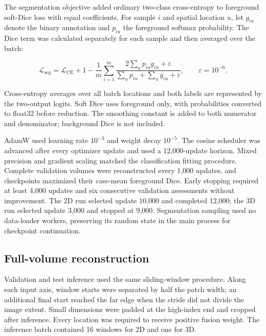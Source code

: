 \documentclass[11pt,a4paper]{article}
\begin{document}
The segmentation objective added ordinary two-class cross-entropy to foreground soft-Dice loss with equal coefficients. For sample $i$ and spatial location $u$, let $g_{iu}$ denote the binary annotation and $p_{iu}$ the foreground softmax probability. The Dice term was calculated separately for each sample and then averaged over the batch:




\begin{equation}
\label{eq:segmentation-loss}
\mathcal{L}_{\mathrm{seg}}=\mathcal{L}_{\mathrm{CE}}+1-\frac{1}{m}\sum_{i=1}^{m}\frac{2\sum_u p_{iu}g_{iu}+\varepsilon}{\sum_u p_{iu}+\sum_u g_{iu}+\varepsilon},\qquad \varepsilon=10^{-6}.
\end{equation}


Cross-entropy averages over all batch locations and both labels are represented by the two-output logits. Soft Dice uses foreground only, with probabilities converted to float32 before reduction. The smoothing constant is added to both numerator and denominator; background Dice is not included.



AdamW used learning rate $10^{-3}$ and weight decay $10^{-5}$. The cosine scheduler was advanced after every optimizer update and used a 12,000-update horizon. Mixed precision and gradient scaling matched the classification fitting procedure. Complete validation volumes were reconstructed every 1,000 updates, and checkpoints maximized their case-mean foreground Dice. Early stopping required at least 4,000 updates and six consecutive validation assessments without improvement. The 2D run selected update 10,000 and completed 12,000; the 3D run selected update 3,000 and stopped at 9,000. Segmentation sampling used no data-loader workers, preserving its random state in the main process for checkpoint continuation.



\subsection*{Full-volume reconstruction}

Validation and test inference used the same sliding-window procedure. Along each input axis, window starts were separated by half the patch width; an additional final start reached the far edge when the stride did not divide the image extent. Small dimensions were padded at the high-index end and cropped after inference. Every location was required to receive positive fusion weight. The inference batch contained 16 windows for 2D and one for 3D.
\end{document}
